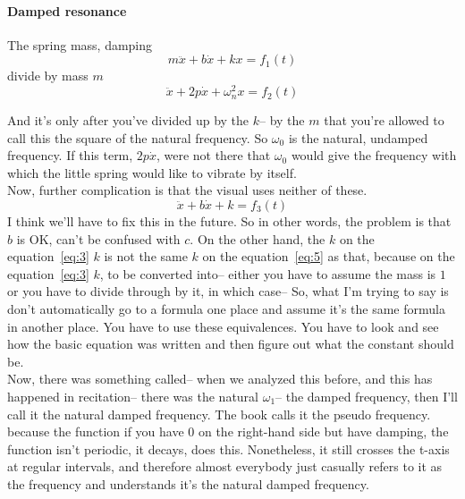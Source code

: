 \paragraph{Damped resonance}
The spring mass, damping
\begin{equation}
  \label{eq:3}
  m\ddot x + b\dot x + kx = f_1(t) 
\end{equation}
divide by mass $m$
\begin{equation*}
  \ddot x + 2p \dot x + \omega _ n^2 x = f_2(t)  
\end{equation*}

And it's only after you've divided up by the $k$--
by the $m$ that you're allowed to call this
the square of the natural frequency.
So $\omega _0$ is the natural, undamped frequency.
If this term, $2p \dot x$, were not there that $\omega _0$
would give the frequency with which the little spring would
like to vibrate by itself.\\

Now, further complication is that the visual
uses neither of these.
\begin{equation}
  \label{eq:5}
  \ddot x + b \dot x + k = f_3 (t)
\end{equation}
I think we'll have to fix this in the future.
So in other words, the problem is
that $b$ is OK, can't be confused with $c$.
On the other hand, the $k$ on the equation~\ref{eq:3} $k$ is
not the same $k$ on the equation~\ref{eq:5} as that,
because on the equation~\ref{eq:3}  $k$, to be converted into--
either you have to assume the mass is
$1$ or you have to divide through by it, in which case--
So, what I'm trying to say is don't automatically
go to a formula one place and assume
it's the same formula in another place.
You have to use these equivalences.
You have to look and see how the basic equation was written
and then figure out what the constant should be.\\


Now, there was something called--
when we analyzed this before, and this has happened
in recitation-- there was the natural $\omega _1$--
the damped frequency, then I'll call it
the natural damped frequency.
The book calls it the pseudo frequency.
because the function if you have $0$ on the right-hand side
but have damping, the function isn't periodic, it decays,
does this.
Nonetheless, it still crosses the t-axis at regular
intervals, and therefore almost everybody just
casually refers to it as the frequency
and understands it's the natural damped frequency.\\

